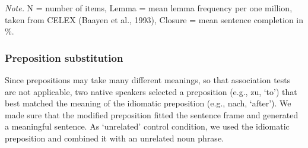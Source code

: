 \documentclass[output=paper]{langsci/langscibook}
\begin{document}
\begin{table}[]
\caption{textit{Idiomatic Sentences and Stimulus Characteristics of the Idiomatic and Modified Preposition, and Unrelated Prepositional Phrase in Experiment 3.}}
\label{tab:Table6}
\footnotesize{\textit{Note.} N = number of items, Lemma = mean lemma frequency per one million, taken from CELEX (Baayen et al., 1993), Closure = mean sentence completion in \%.}
\end{table}

\subsubsection{Preposition substitution}
Since prepositions may take many different meanings, so that association tests are not applicable, two native speakers selected a preposition (e.g., zu, ‘to’) that best matched the meaning of the idiomatic preposition (e.g., nach, ‘after’). We made sure that the modified preposition fitted the sentence frame and generated a meaningful sentence. As ‘unrelated’ control condition, we used the idiomatic preposition and combined it with an unrelated noun phrase. 
\end{document}
